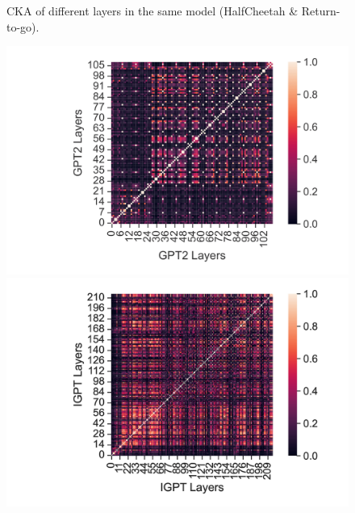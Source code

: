 \documentclass{article}
\begin{document}
\begin{figure}[H]
\begin{minipage}[b]{0.32\linewidth}
    \end{minipage}
    \caption{CKA of different layers in the same model (HalfCheetah \& Return-to-go).}
\end{figure}

\begin{figure}[H]
    \centering
    \begin{minipage}[b]{0.32\linewidth}
        \includegraphics[width=\linewidth]{figs/cka_40_40_gpt2gpt2_halfcheetah_medium_666_action.png}
    \end{minipage}
    \begin{minipage}[b]{0.32\linewidth}
        \includegraphics[width=\linewidth]{figs/cka_40_40_igptigpt_halfcheetah_medium_666_action.png}
    \end{minipage}
    \begin{minipage}[b]{0.32\linewidth}

\end{minipage}
\end{figure}
\end{document}
